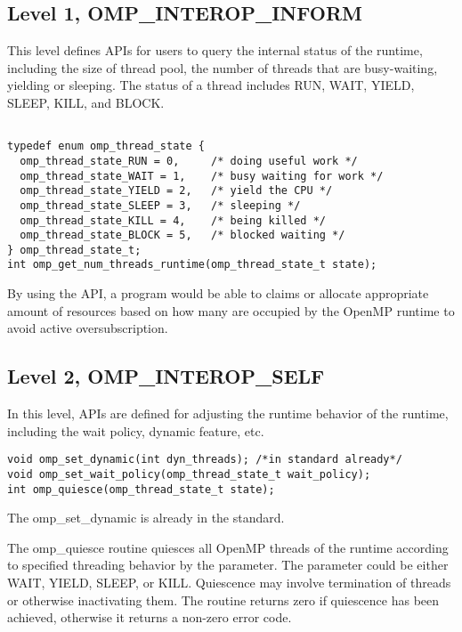 {\subsection{Level 1, OMP\_INTEROP\_INFORM}
This level defines APIs for users to query the internal status of the runtime, including the size of thread pool, the number of threads
that are busy-waiting, yielding or sleeping. The status of a thread includes RUN, WAIT, YIELD, SLEEP, KILL, and BLOCK. 

\lstset{basicstyle=\sffamily\small,language=c, numbersep=1pt}
\begin{lstlisting}[frame=single]  % Start your code-block

typedef enum omp_thread_state {
  omp_thread_state_RUN = 0,     /* doing useful work */
  omp_thread_state_WAIT = 1,    /* busy waiting for work */
  omp_thread_state_YIELD = 2,   /* yield the CPU */
  omp_thread_state_SLEEP = 3,   /* sleeping */
  omp_thread_state_KILL = 4,    /* being killed */
  omp_thread_state_BLOCK = 5,   /* blocked waiting */
} omp_thread_state_t; 
int omp_get_num_threads_runtime(omp_thread_state_t state);
\end{lstlisting}

By using the API, a program would be able to claims or allocate appropriate amount of resources based on how many are occupied by the OpenMP
runtime to avoid active oversubscription. 

\subsection{Level 2, OMP\_INTEROP\_SELF} 
In this level, APIs are defined for adjusting the runtime behavior of the runtime, including the wait policy, dynamic feature, etc.

\begin{lstlisting}[frame=single]
void omp_set_dynamic(int dyn_threads); /*in standard already*/
void omp_set_wait_policy(omp_thread_state_t wait_policy);
int omp_quiesce(omp_thread_state_t state);
\end{lstlisting}
The {\sf omp\_set\_dynamic} is already in the standard. 

The {\sf omp\_quiesce} routine quiesces all OpenMP threads of the runtime according to specified threading behavior by the parameter. The
parameter could be either WAIT, YIELD, SLEEP, or KILL. Quiescence may involve termination
 of threads or otherwise inactivating them. The routine returns zero if quiescence has been achieved, otherwise it returns a non-zero error code.

}
